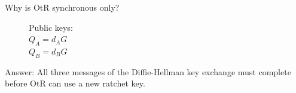 \documentclass[fleqn,xcolor={usenames,dvipsnames}]{beamer}
\begin{document}
\begin{frame}{Why is OtR synchronous only?}
\begin{figure}[th]
\begin{minipage}[b]{0.45\linewidth}
      Public keys: \\
      \hspace*{2pt} $Q_A = d_A G$ \\
      \hspace*{2pt} $Q_B = d_B G$ \\
      \bigskip
    \end{minipage}
  \end{figure} %

\pause

Answer: 
All three messages of the Diffie-Hellman key exchange must complete 
before OtR can use a new ratchet key.
\end{frame}


%
%
\end{document}
